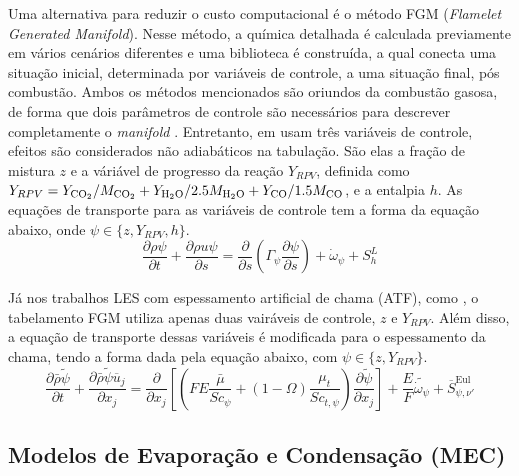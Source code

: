 Uma alternativa para reduzir o custo computacional é o método FGM (\emph{Flamelet Generated Manifold}). 
Nesse método, a química detalhada é calculada previamente em vários cenários diferentes e uma biblioteca é construída, a qual conecta uma situação inicial, determinada por variáveis de controle, a uma situação final, pós combustão.
Ambos os métodos mencionados são oriundos da combustão gasosa, de forma que dois parâmetros de controle são necessários para descrever completamente o \emph{manifold} \cite{PetersN2000}.
Entretanto, em  usam três variáveis de controle, efeitos são considerados não adiabáticos na tabulação.
São elas a fração de mistura $z$ e a váriável de progresso da reação $Y_{RPV}$, definida como $Y_{RPV}= Y_{\text{CO}_2} / {M_{\text{CO}_2}}+  Y_{\text H_2 \text O} / {2.5 M_{\text H_2 \text O}} + Y_{\text{CO}} / {1.5 M_{\text{CO}}}$, e a entalpia $h$.
As equações de transporte para as variáveis de controle tem a forma da equação abaixo, onde $\psi \in \lbrace z, Y_{RPV}, h\rbrace$.
\begin{equation}
    \frac{\partial \rho\psi}{\partial t} +
    \frac{\partial \rho u \psi}{\partial s} =
    \frac{\partial}{\partial s} \left(
        \Gamma_\psi \frac{\partial \psi}{\partial s}
        \right) +
    \dot\omega_\psi +
    S_h^L
\end{equation} 

Já nos trabalhos LES com espessamento artificial de chama (ATF), como \cite{SacomanoF2017PhD, SacomanoF2017CF, SacomanoF2020CF}, o tabelamento FGM utiliza apenas duas vairáveis de controle, $z$ e $Y_{RPV}$.
Além disso, a equação de transporte dessas variáveis é modificada para o espessamento da chama, tendo a forma dada pela equação abaixo, com $\psi \in \lbrace z, Y_{RPV}\rbrace$.
\begin{equation}
    \frac{\partial \bar \rho \widetilde \psi}{\partial t} + 
    \frac{\partial \bar \rho \widetilde \psi \overline u_j}{\partial x_j} =
    \frac{\partial }{\partial x_j} \left[ \left(
    FE \frac{\bar\mu}{Sc_\psi} + (1-\Omega)\frac{\mu_t}{Sc_{t,\psi}}
    \right) \frac{\partial \widetilde \psi}{\partial x_j}
    \right] +
    \frac{E}{F}\widetilde{\dot{\omega}_\psi} + 
    \overline S_{\psi,\nu'}^{\text{Eul}}
\end{equation}


\subsection{Modelos de Evaporação e Condensação (MEC)} \label{sec:MEC}


